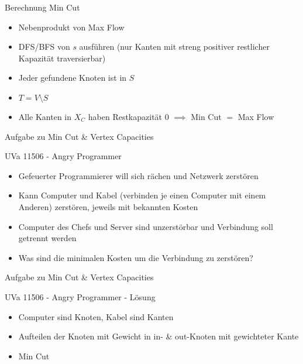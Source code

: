 \begin{frame}{Berechnung Min Cut}
    \begin{itemize}
        \item Nebenprodukt von Max Flow
        \pause\item DFS/BFS von $s$ ausführen (nur Kanten mit streng positiver restlicher Kapazität
        traversierbar)
        \pause\item Jeder gefundene Knoten ist in $S$
        \pause\item \(T = V\setminus S\)
        \pause\item Alle Kanten in $X_C$ haben Restkapazität $0$ \(\implies\) Min
        Cut $=$ Max Flow
    \end{itemize}
\end{frame}

\begin{frame}{Aufgabe zu Min Cut \& Vertex Capacities}
    \begin{block}{UVa 11506 - Angry Programmer}
        \begin{itemize}
            \item Gefeuerter Programmierer will sich rächen und Netzwerk zerstören
            \pause\item Kann Computer und Kabel (verbinden je einen Computer mit einem
            Anderen) zerstören, jeweils mit bekannten Kosten
            \pause\item Computer des Chefs und Server sind unzerstörbar und Verbindung
soll getrennt werden
            \pause\item Was sind die minimalen Kosten um die Verbindung zu zerstören?
        \end{itemize}
    \end{block}
\end{frame}

\begin{frame}{Aufgabe zu Min Cut \& Vertex Capacities}
    \begin{block}{UVa 11506 - Angry Programmer - Lösung}
        \begin{itemize}
            \pause\item Computer sind Knoten, Kabel sind Kanten
            \pause\item Aufteilen der Knoten mit Gewicht in in- \& out-Knoten mit
            gewichteter Kante
            \pause\item Min Cut
        \end{itemize}
    \end{block}
\end{frame}

